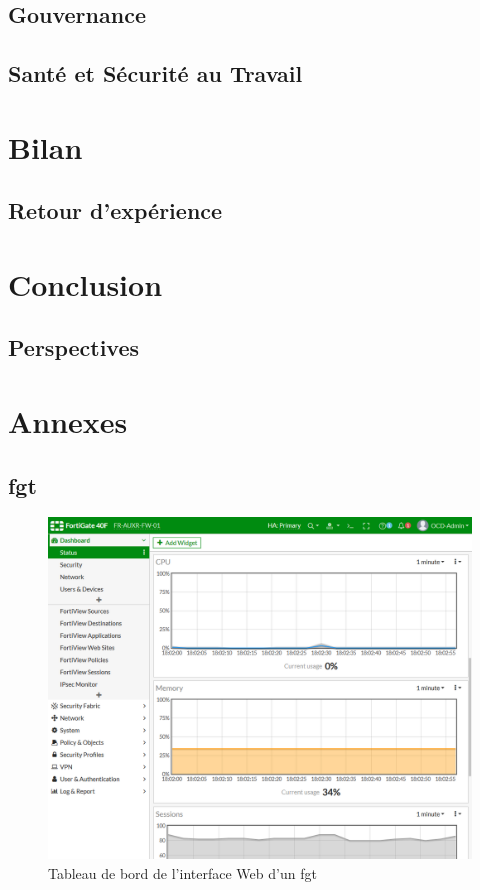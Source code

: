 \documentclass[12pt, oneside, a4paper, titlepage]{report}
\begin{document}
\section{Gouvernance}%
\label{sec:rse::gouv}

\section{Santé et Sécurité au Travail}%
\label{sec:rse::sst}


\chapter{Bilan}%
\label{cha:bilan}

\section{Retour d'expérience}%
\label{sec:bilan::ret-exp}


\chapter{Conclusion}%
\label{cha:conclu}

\section{Perspectives}%
\label{sec:conclu::persp}


\chapter{Annexes}%
\label{cha:annexes}

\section{\acrlong{fgt}}%
\label{sec:annexes::fgt}

\begin{figure}[h!]
    \centering
    \includegraphics[width = \linewidth]{img/fgt-auxr/dashboard.png}
    \caption{Tableau de bord de l'interface Web d'un \acrlong{fgt}}%
    \label{fig:fgt-auxr/dashboard.png}
\end{figure}
\end{document}
